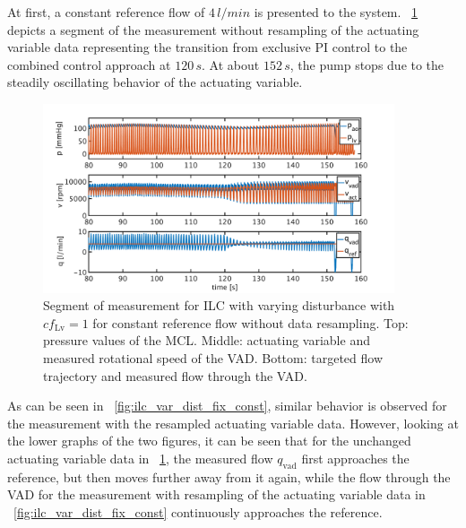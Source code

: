 At first, a constant reference flow of $4\,l/min$ is presented to the system. \figurename~\ref{fig:ilc_var_dist_unfix_const} depicts a segment of the measurement without resampling of the actuating variable data representing the transition from exclusive PI control to the combined control approach at $120\,s$. At about $152\,s$, the pump stops due to the steadily oscillating behavior of the actuating variable.
\begin{figure}[ht!]
  \centering
  \includegraphics[width=0.925\textwidth]{images/chapt_5/ILC/ilc_var_dist_unfix_const.pdf}
  \caption[Segment of measurement for ILC with varying disturbance with $cf_{\mathrm{Lv}}=1$ for constant reference flow without data resampling]{Segment of measurement for ILC with varying disturbance with $cf_{\mathrm{Lv}}=1$ for constant reference flow without data resampling. Top:  pressure values of the MCL. Middle: actuating variable and measured rotational speed of the VAD. Bottom: targeted flow trajectory and measured flow through the VAD.}
  \label{fig:ilc_var_dist_unfix_const}
\end{figure}
As can be seen in \figurename~\ref{fig:ilc_var_dist_fix_const}, similar behavior is observed for the measurement with the resampled actuating variable data.
However, looking at the lower graphs of the two figures, it can be seen that for the unchanged actuating variable data in \figurename~\ref{fig:ilc_var_dist_unfix_const}, the measured flow $q_{\mathrm{vad}}$ first approaches the reference, but then moves further away from it again, while the flow through the VAD for the measurement with resampling of the actuating variable data in \figurename~\ref{fig:ilc_var_dist_fix_const} continuously approaches the reference.
